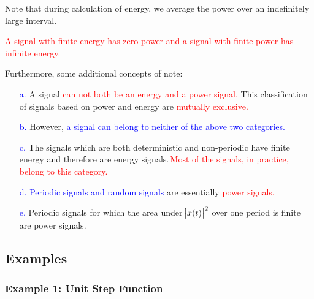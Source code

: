 \documentclass[
  12pt,
  a4paper,
]{report}
\newcommand{\bluetext}[1]{\textcolor{blue}{#1}}
\begin{document}
Note that during calculation of energy, we average the power over an indefinitely large interval.\\ \begin{mdframed}\label{fig:energy-power-relationship-1}     
    \begin{center}         
        \textcolor{red}{A signal with finite energy has zero power and a signal with finite power has infinite energy.}     
    \end{center} 
\end{mdframed}

Furthermore, some additional concepts of note:\\ 
\begin{mdframed}
\label{fig:energy-power-relationship-itemize}
    \begin{center}
        \begin{itemize}             
            \item[\bluetext{a.}] A signal \textcolor{red}{can not both be an energy and a power signal.} This classification of signals based on power and energy are \textcolor{red}{mutually exclusive.}             
            \item[\bluetext{b.}] However, \bluetext{a signal can belong to neither of the above two categories.}             
            \item[\bluetext{c.}] The signals which are both deterministic and non-periodic have finite energy and therefore are energy signals.\,\textcolor{red}{Most of the signals, in practice, belong to this category.}             
            \item[\bluetext{d.}] \bluetext{Periodic signals and random signals} are essentially \textcolor{red}{power signals.}             
            \item[\bluetext{e.}] Periodic signals for which the area under \(\abs{x(t)}^2\) over one period is finite are power signals.         
        \end{itemize}     
    \end{center} 
\end{mdframed}

\subsection{Examples}\label{examples}

\subsubsection{Example 1: Unit Step
Function}\label{example-1-unit-step-function}
\end{document}
